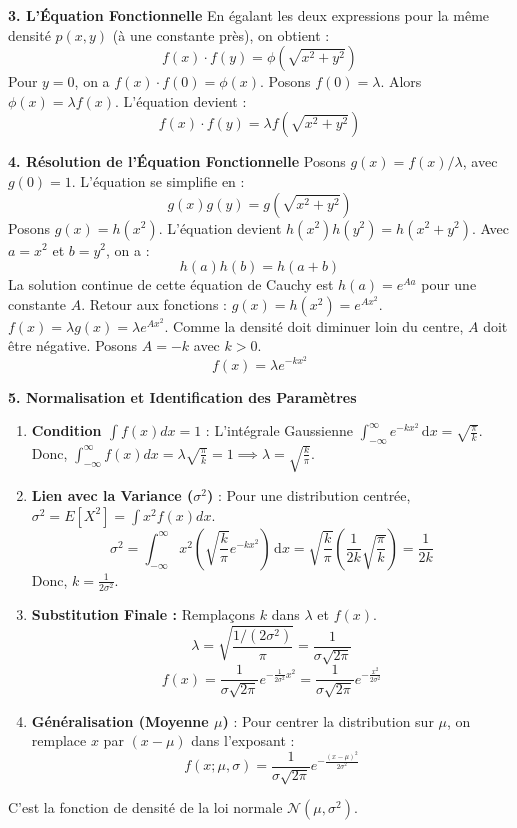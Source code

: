 \begin{proofbox}
\textbf{3. L'Équation Fonctionnelle}
En égalant les deux expressions pour la même densité $p(x, y)$ (à une constante près), on obtient :
$$ f(x) \cdot f(y) = \phi(\sqrt{x^2 + y^2}) $$
Pour $y=0$, on a $f(x) \cdot f(0) = \phi(x)$. Posons $f(0) = \lambda$. Alors $\phi(x) = \lambda f(x)$.
L'équation devient :
$$ f(x) \cdot f(y) = \lambda f(\sqrt{x^2 + y^2}) $$

\textbf{4. Résolution de l'Équation Fonctionnelle}
Posons $g(x) = f(x)/\lambda$, avec $g(0)=1$. L'équation se simplifie en :
$$ g(x) g(y) = g(\sqrt{x^2 + y^2}) $$
Posons $g(x) = h(x^2)$. L'équation devient $h(x^2)h(y^2) = h(x^2+y^2)$. Avec $a=x^2$ et $b=y^2$, on a :
$$ h(a) h(b) = h(a+b) $$
La solution continue de cette équation de Cauchy est $h(a) = e^{Aa}$ pour une constante $A$.
Retour aux fonctions : $g(x) = h(x^2) = e^{Ax^2}$. $f(x) = \lambda g(x) = \lambda e^{Ax^2}$.
Comme la densité doit diminuer loin du centre, $A$ doit être négative. Posons $A = -k$ avec $k>0$.
$$ f(x) = \lambda e^{-k x^2} $$

\textbf{5. Normalisation et Identification des Paramètres}
\begin{enumerate}
    \item \textbf{Condition $\int f(x) dx = 1$} : L'intégrale Gaussienne $\int_{-\infty}^{\infty} e^{-k x^2} \, \mathrm{d}x = \sqrt{\frac{\pi}{k}}$.
    Donc, $\int_{-\infty}^{\infty} f(x) dx = \lambda \sqrt{\frac{\pi}{k}} = 1 \implies \lambda = \sqrt{\frac{k}{\pi}}$.
    \item \textbf{Lien avec la Variance ($\sigma^2$)} : Pour une distribution centrée, $\sigma^2 = E[X^2] = \int x^2 f(x) dx$.
    $$ \sigma^2 = \int_{-\infty}^{\infty} x^2 \left( \sqrt{\frac{k}{\pi}} e^{-k x^2} \right) \, \mathrm{d}x = \sqrt{\frac{k}{\pi}} \left( \frac{1}{2k} \sqrt{\frac{\pi}{k}} \right) = \frac{1}{2k} $$
    Donc, $k = \frac{1}{2\sigma^2}$.
    \item \textbf{Substitution Finale :} Remplaçons $k$ dans $\lambda$ et $f(x)$.
    $$ \lambda = \sqrt{\frac{1/(2\sigma^2)}{\pi}} = \frac{1}{\sigma\sqrt{2\pi}} $$
    $$ f(x) = \frac{1}{\sigma\sqrt{2\pi}} e^{-\frac{1}{2\sigma^2} x^2} = \frac{1}{\sigma\sqrt{2\pi}} e^{ -\frac{x^2}{2\sigma^2} } $$
    \item \textbf{Généralisation (Moyenne $\mu$)} : Pour centrer la distribution sur $\mu$, on remplace $x$ par $(x-\mu)$ dans l'exposant :
    $$ f(x; \mu, \sigma) = \frac{1}{\sigma \sqrt{2\pi}} e^{ -\frac{(x-\mu)^2}{2\sigma^2} } $$
\end{enumerate}
C'est la fonction de densité de la loi normale $\mathcal{N}(\mu, \sigma^2)$.
\end{proofbox}

